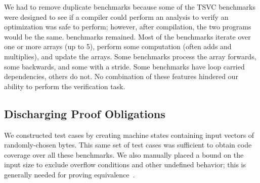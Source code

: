 We had to remove duplicate benchmarks because some of the TSVC
benchmarks were designed to see if a compiler could perform an
analysis to verify an optimization was safe to perform; however,
after compilation, the two programs would be the same. \totalbench{}
benchmarks remained. Most of the benchmarks iterate over one or
more arrays (up to 5), perform some computation (often adds and
multiplies), and update the arrays. Some benchmarks process the array
forwards, some backwards, and some with a stride. Some benchmarks have
loop carried dependencies, others do not. No combination of these
features hindered our ability to perform the verification task.

\subsection{Discharging Proof Obligations}

We constructed test cases by creating machine states containing input
vectors of randomly-chosen bytes. This same set of test cases was
sufficient to obtain code coverage over all these benchmarks. We
also manually placed a bound on the input size to exclude overflow
conditions and other undefined behavior; this is generally needed for
proving equivalence~\cite{Dahiya17HVC}.











